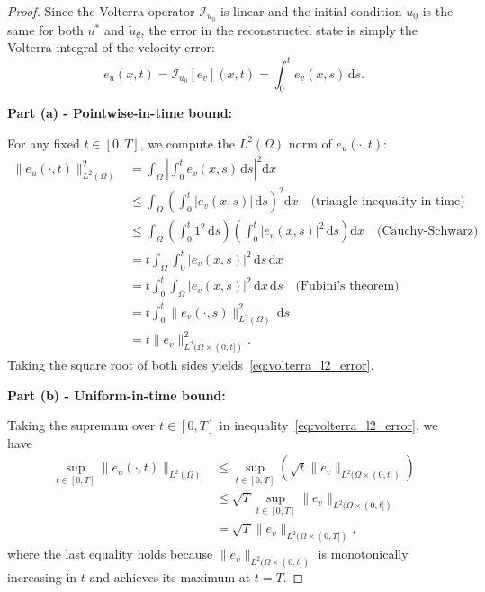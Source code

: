 \documentclass[11pt,reqno]{amsart}
\theoremstyle{plain}
\theoremstyle{definition}
\theoremstyle{remark}
\begin{document}
\begin{proof}
Since the Volterra operator $\mathcal{I}_{u_0}$ is linear and the initial condition $u_0$ is the same for both $u^*$ and $\tilde{u}_\theta$, the error in the reconstructed state is simply the Volterra integral of the velocity error:
\begin{equation}
    e_u(x,t) = \mathcal{I}_{u_0}[e_v](x,t) = \int_0^t e_v(x,s) \, \mathrm{d}s.
\end{equation}

\medskip
\noindent\textbf{Part (a) - Pointwise-in-time bound:}

\noindent For any fixed $t \in [0,T]$, we compute the $L^2(\Omega)$ norm of $e_u(\cdot, t)$:
\begin{align}
    \|e_u(\cdot, t)\|_{L^2(\Omega)}^2 
    &= \int_\Omega \left| \int_0^t e_v(x,s) \, \mathrm{d}s \right|^2 \mathrm{d}x \\
    &\leq \int_\Omega \left( \int_0^t |e_v(x,s)| \, \mathrm{d}s \right)^2 \mathrm{d}x \quad \text{(triangle inequality in time)} \\
    &\leq \int_\Omega \left( \int_0^t 1^2 \, \mathrm{d}s \right) \left( \int_0^t |e_v(x,s)|^2 \, \mathrm{d}s \right) \mathrm{d}x \quad \text{(Cauchy-Schwarz)} \\
    &= t \int_\Omega \int_0^t |e_v(x,s)|^2 \, \mathrm{d}s \, \mathrm{d}x \\
    &= t \int_0^t \int_\Omega |e_v(x,s)|^2 \, \mathrm{d}x \, \mathrm{d}s \quad \text{(Fubini's theorem)} \\
    &= t \int_0^t \|e_v(\cdot, s)\|_{L^2(\Omega)}^2 \, \mathrm{d}s \\
    &= t \|e_v\|_{L^2(\Omega \times (0,t])}^2.
\end{align}
Taking the square root of both sides yields~\eqref{eq:volterra_l2_error}.

\medskip
\noindent\textbf{Part (b) - Uniform-in-time bound:}

\noindent Taking the supremum over $t \in [0,T]$ in inequality~\eqref{eq:volterra_l2_error}, we have
\begin{align}
    \sup_{t \in [0,T]} \|e_u(\cdot, t)\|_{L^2(\Omega)} 
    &\leq \sup_{t \in [0,T]} \left( \sqrt{t} \|e_v\|_{L^2(\Omega \times (0,t])} \right) \\
    &\leq \sqrt{T} \sup_{t \in [0,T]} \|e_v\|_{L^2(\Omega \times (0,t])} \\
    &= \sqrt{T} \|e_v\|_{L^2(\Omega \times (0,T])},
\end{align}
where the last equality holds because $\|e_v\|_{L^2(\Omega \times (0,t])}$ is monotonically increasing in $t$ and achieves its maximum at $t=T$.


\end{proof}
\end{document}
